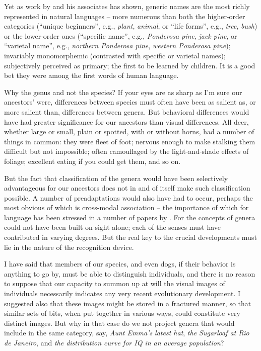 Yet as work by \citet{Berlin1972} and his associates has shown, generic names are the most richly represented in natural languages -- more numerous than both the higher-order categories (``unique beginners'', e.g., \textit{plant}, \textit{animal}, or ``life forms'', e.g., \textit{tree}, \textit{bush}) or the lower-order ones (``specific name'', e.g., \textit{Ponderosa pine}, \textit{jack pine}, or ``varietal name'', e.g., \textit{northern Ponderosa pine}, \textit{western Ponderosa pine}); invariably monomorphemic (contrasted with specific or varietal names); subjectively perceived as primary; the first to be learned by children. It is a good bet they were among the first words of human language.

Why the genus and not the species? If your eyes are as sharp as I'm sure our ancestors' were, differences between species must often have been as salient as, or more salient than, differences between genera. But behavioral differences would have had greater significance for our ancestors than visual differences. All deer, whether large or small, plain or spotted, with or without horns, had a number of things in common: they were fleet of foot; nervous enough to make stalking them difficult but not impossible; often camouflaged by the light-and-shade effects of foliage; excellent eating if you could get them, and so on.

But the fact that classification of the genera would have been selectively advantageous for our ancestors does not in and of itself make such classification possible. A number of preadaptations would also have had to occur, perhaps the most obvious of which is cross-modal association -- the importance of which for language has been stressed in a number of papers by \citet{Geschwind1974}. For the concepts of genera could not have been built on sight alone; each of the senses must have contributed in varying degrees. But the real key to the crucial developments must lie in the nature of the recognition device.

I have said that members of our species, and even dogs, if their behavior is anything to go by, must be able to distinguish individuals, and there is no reason to suppose that our capacity to summon up at will the visual images of individuals necessarily indicates any very recent evolutionary development. I suggested also that these images might be stored in a fractured manner, so that similar sets of bits, when put together in various ways, could constitute very distinct images. But why in that case do we not project genera that would include in the same category, say, \textit{Aunt Emma's latest hat}, \textit{the Sugarloaf at Rio de Janeiro}, and \textit{the distribution curve for IQ in an average population}?

